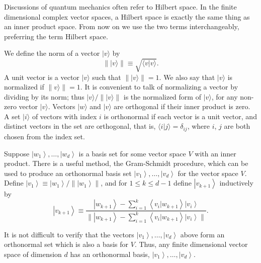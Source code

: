 \documentclass[
	11pt, %
	fleqn, %
	a4paper, %
]{LegrandOrangeBook}
\begin{document}
Discussions of quantum mechanics often refer to Hilbert space. In the finite dimensional complex vector spaces, a Hilbert space is exactly the same thing as an inner product space. From now on we use the two terms interchangeably, preferring the term Hilbert space.


We define the norm of a vector $|v\rangle$ by
$$
\||v\rangle \| \equiv \sqrt{\langle v | v\rangle}.
$$
A unit vector is a vector $|v\rangle$ such that $\||v\rangle \|=1$. We also say that $|v\rangle$ is normalized if $\| v\rangle \|=1$. It is convenient to talk of normalizing a vector by dividing by its norm; thus $|v\rangle / \||v\rangle \|$ is the normalized form of $|v\rangle$, for any non-zero vector $|v\rangle$. 
Vectors $|w\rangle$ and $|v\rangle$ are orthogonal if their inner product is zero. A set $|i\rangle$ of vectors with index $i$ is orthonormal if each vector is a unit vector, and distinct vectors in the set are orthogonal, that is, $\langle i | j\rangle=\delta_{i j}$, where $i$, $j$ are both chosen from the index set.


\begin{proposition}
    Suppose $\left|w_{1}\right\rangle, \ldots,\left|w_{d}\right\rangle$ is a basis set for some vector space $V$ with an inner product. There is a useful method, the Gram-Schmidt procedure, which can be used to produce an orthonormal basis set $\left|v_{1}\right\rangle, \ldots,\left|v_{d}\right\rangle$ for the vector space $V$. Define $\left|v_{1}\right\rangle \equiv\left|w_{1}\right\rangle / \|\left|w_{1}\right\rangle \|$, and for $1 \leq k \leq d-1$ define $\left|v_{k+1}\right\rangle$ inductively by
$$
\left|v_{k+1}\right\rangle \equiv \frac{\left|w_{k+1}\right\rangle-\sum_{i=1}^{k}\left\langle v_{i} | w_{k+1}\right\rangle\left|v_{i}\right\rangle}{\|\left|w_{k+1}\right\rangle-\sum_{i=1}^{k}\left\langle v_{i} | w_{k+1}\right\rangle\left|v_{i}\right\rangle \|}.
$$
\end{proposition}

It is not difficult to verify that the vectors $\left|v_{1}\right\rangle, \ldots,\left|v_{d}\right\rangle$ above form an orthonormal set which is also a basis for $V$. Thus, any finite dimensional vector space of dimension $d$ has an orthonormal basis, $\left|v_{1}\right\rangle, \ldots,\left|v_{d}\right\rangle$.
\end{document}
